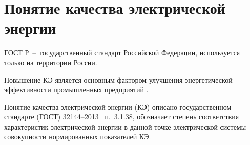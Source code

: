 



\section{Понятие качества электрической энергии}\label{sec:ch4/sect1} 
ГОСТ Р~--~государственный стандарт Российской Федерации, используется только на территории России.

Повышение КЭ является основным фактором улучшения энергетической эффективности промышленных предприятий \cite{law_energy saving_2009}. 

Понятие качества электрической энергии (КЭ) описано государственном стандарте (ГОСТ) 32144--2013~\cite{GOST32144-2013} п.~3.1.38, обозначает степень соответствия характеристик электрической энергии в данной точке электрической системы совокупности нормированных показателей КЭ.

